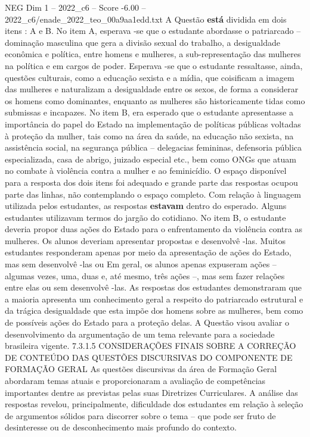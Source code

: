 \begin{textsample}{NEG Dim 1 – 2022\_c6 – Score -6.00 – 2022\_c6/enade\_2022\_teo\_00a9aa1edd.txt}
A Questão \textbf{está} dividida em dois itens : A e B.
No item A, esperava -se que o estudante abordasse o patriarcado – dominação masculina que gera a divisão sexual do trabalho, a desigualdade econômica e política, entre homens e mulheres, a sub-representação das mulheres na política e em cargos de poder.
Esperava -se que o estudante ressaltasse, ainda, questões culturais, como a educação sexista e a mídia, que coisificam a imagem das mulheres e naturalizam a desigualdade entre os sexos, de forma a considerar os homens como dominantes, enquanto as mulheres são historicamente tidas como submissas e incapazes.
No item B, era esperado que o estudante apresentasse a importância do papel do Estado na implementação de políticas públicas voltadas à proteção da mulher, tais como na área da saúde, na educação não sexista, na assistência social, na segurança pública – delegacias femininas, defensoria pública especializada, casa de abrigo, juizado especial etc., bem como ONGs que atuam no combate à violência contra a mulher e ao feminicídio.
O espaço disponível para a resposta dos dois itens foi adequado e grande parte das respostas ocupou parte das linhas, não contemplando o espaço completo.
Com relação à linguagem utilizada pelos estudantes, as respostas \textbf{estavam} dentro do esperado.
Alguns estudantes utilizavam termos do jargão do cotidiano.
No item B, o estudante deveria propor duas ações do Estado para o enfrentamento da violência contra as mulheres.
Os alunos deveriam apresentar propostas e desenvolvê -las.
Muitos estudantes responderam apenas por meio da apresentação de ações do Estado, mas sem desenvolvê -las ou Em geral, os alunos apenas expuseram ações – algumas vezes, uma, duas e, até mesmo, três ações –, mas sem fazer relações entre elas ou sem desenvolvê -las.
As respostas dos estudantes demonstraram que a maioria apresenta um conhecimento geral a respeito do patriarcado estrutural e da trágica desigualdade que esta impõe dos homens sobre as mulheres, bem como de possíveis ações do Estado para a proteção delas.
A Questão visou avaliar o desenvolvimento da argumentação de um tema relevante para a sociedade brasileira vigente. 7.3.1.5 CONSIDERAÇÕES FINAIS SOBRE A CORREÇÃO DE CONTEÚDO DAS QUESTÕES DISCURSIVAS DO COMPONENTE DE FORMAÇÃO GERAL As questões discursivas da área de Formação Geral abordaram temas atuais e proporcionaram a avaliação de competências importantes dentre as previstas pelas suas Diretrizes Curriculares.
A análise das respostas revelou, principalmente, dificuldade dos estudantes em relação à seleção de argumentos sólidos para discorrer sobre o tema – que pode ser fruto de desinteresse ou de desconhecimento mais profundo do contexto.

\end{textsample}
